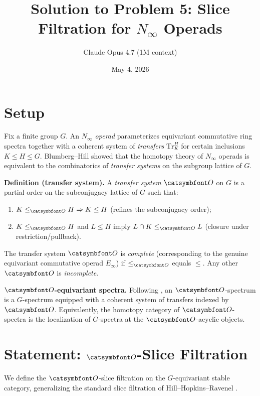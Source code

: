 

\title{Solution to Problem 5: Slice Filtration for $N_\infty$ Operads}
\author{Claude Opus 4.7 (1M context)}
\date{May 4, 2026}


\maketitle

\section*{Setup}

Fix a finite group $G$.  An \emph{$N_\infty$ operad} parameterizes equivariant commutative ring spectra together with a coherent system of \emph{transfers} $\mathrm{Tr}^H_K$ for certain inclusions $K\le H\le G$.  Blumberg--Hill \cite{BH15} showed that the homotopy theory of $N_\infty$ operads is equivalent to the combinatorics of \emph{transfer systems} on the subgroup lattice of $G$.

\medskip
\noindent\textbf{Definition (transfer system).}  A \emph{transfer system} $\aO$ on $G$ is a partial order on the subconjugacy lattice of $G$ such that:
\begin{enumerate}\setlength\itemsep{2pt}
\item $K\le_\aO H\Rightarrow K\le H$ (refines the subconjugacy order);
\item $K\le_\aO H$ and $L\le H$ imply $L\cap K\le_\aO L$ (closure under restriction/pullback).
\end{enumerate}
The transfer system $\aO$ is \emph{complete} (corresponding to the genuine equivariant commutative operad $E_\infty$) if $\le_\aO$ equals $\le$.  Any other $\aO$ is \emph{incomplete}.

\medskip
\noindent\textbf{$\aO$-equivariant spectra.}  Following \cite{BH18}, an $\aO$-spectrum is a $G$-spectrum equipped with a coherent system of transfers indexed by $\aO$.  Equivalently, the homotopy category of $\aO$-spectra is the localization of $G$-spectra at the $\aO$-acyclic objects.

\section*{Statement: $\aO$-Slice Filtration}

We define the $\aO$-slice filtration on the $G$-equivariant stable category, generalizing the standard slice filtration of Hill--Hopkins--Ravenel \cite{HHR16}.

